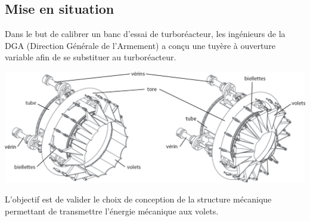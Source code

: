 \documentclass[10pt,fleqn]{article} %
\begin{document}

\vspace{4.5cm}
\pagestyle{fancy}
\thispagestyle{plain}


\def\columnseprulecolor{\color{ocre}}
\setlength{\columnseprule}{0.4pt} 

\ifprof
\else
\begin{multicols}{2}
\fi
\section*{Mise en situation}
Dans le but de calibrer un banc d'essai de turboréacteur, les ingénieurs de la DGA (Direction Générale de l'Armement) a conçu une tuyère à ouverture variable afin de se substituer au turboréacteur. 
\begin{center}
\includegraphics[width=\linewidth]{images/fig_01}
\end{center}


\begin{obj}
L'objectif est de valider le choix de conception de la structure mécanique permettant
de transmettre l'énergie mécanique aux volets.
\end{obj}


\end{multicols}
\end{document}
